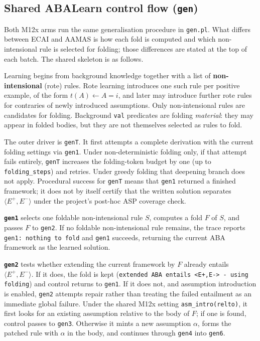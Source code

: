\documentclass[11pt]{article}
\begin{document}
\subsection{Shared ABALearn control flow (\texttt{gen})}

Both M12x arms run the same generalisation procedure in \texttt{gen.pl}. What differs between ECAI and AAMAS is how each fold is computed and which non-intensional rule is selected for folding; those differences are stated at the top of each batch. The shared skeleton is as follows.

Learning begins from background knowledge together with a list of \textbf{non-intensional} (rote) rules. Rote learning introduces one such rule per positive example, of the form \(t(A) \leftarrow A=i\), and later may introduce further rote rules for contraries of newly introduced assumptions. Only non-intensional rules are candidates for folding. Background \texttt{val} predicates are folding \emph{material}: they may appear in folded bodies, but they are not themselves selected as rules to fold.

The outer driver is \texttt{genT}. It first attempts a complete derivation with the current folding settings via \texttt{gen1}. Under non-deterministic folding only, if that attempt fails entirely, \texttt{genT} increases the folding-token budget by one (up to \texttt{folding\_steps}) and retries. Under greedy folding that deepening branch does not apply. Procedural success for \texttt{genT} means that \texttt{gen1} returned a finished framework; it does not by itself certify that the written solution separates \(\langle E^+,E^-\rangle\) under the project's post-hoc ASP coverage check.

\textbf{\texttt{gen1}} selects one foldable non-intensional rule \(S\), computes a fold \(F\) of \(S\), and passes \(F\) to \texttt{gen2}. If no foldable non-intensional rule remains, the trace reports \texttt{gen1: nothing to fold} and \texttt{gen1} succeeds, returning the current ABA framework as the learned solution.

\textbf{\texttt{gen2}} tests whether extending the current framework by \(F\) already entails \(\langle E^+,E^-\rangle\). If it does, the fold is kept (\texttt{extended ABA entails <E+,E-> - using folding}) and control returns to \texttt{gen1}. If it does not, and assumption introduction is enabled, \texttt{gen2} attempts repair rather than treating the failed entailment as an immediate global failure. Under the shared M12x setting \texttt{asm\_intro(relto)}, it first looks for an existing assumption relative to the body of \(F\); if one is found, control passes to \texttt{gen3}. Otherwise it mints a new assumption \(\alpha\), forms the patched rule with \(\alpha\) in the body, and continues through \texttt{gen4} into \texttt{gen6}.
\end{document}
